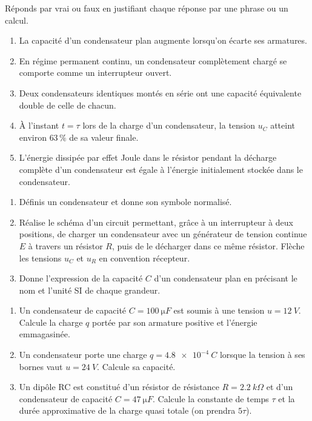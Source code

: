 \documentclass[11pt]{article}
\begin{document}
\begin{exercice}
Réponds par vrai ou faux en justifiant chaque réponse par une phrase ou un calcul.
\begin{enumerate}
\item La capacité d'un condensateur plan augmente lorsqu'on écarte ses armatures.
\item En régime permanent continu, un condensateur complètement chargé se comporte comme un interrupteur ouvert.
\item Deux condensateurs identiques montés en série ont une capacité équivalente double de celle de chacun.
\item À l'instant $t = \tau$ lors de la charge d'un condensateur, la tension $u_C$ atteint environ $63\,\%$ de sa valeur finale.
\item L'énergie dissipée par effet Joule dans le résistor pendant la décharge complète d'un condensateur est égale à l'énergie initialement stockée dans le condensateur.
\end{enumerate}
\end{exercice}

\begin{exercice}
\begin{enumerate}
\item Définis un condensateur et donne son symbole normalisé.
\item Réalise le schéma d'un circuit permettant, grâce à un interrupteur à deux positions, de charger un condensateur avec un générateur de tension continue $E$ à travers un résistor $R$, puis de le décharger dans ce même résistor. Flèche les tensions $u_C$ et $u_R$ en convention récepteur.
\item Donne l'expression de la capacité $C$ d'un condensateur plan en précisant le nom et l'unité SI de chaque grandeur.
\end{enumerate}
\end{exercice}

\begin{exercice}
\begin{enumerate}
\item Un condensateur de capacité $C = \SI{100}{\micro F}$ est soumis à une tension $u = \SI{12}{V}$. Calcule la charge $q$ portée par son armature positive et l'énergie emmagasinée.
\item Un condensateur porte une charge $q = \SI{4,8e-4}{C}$ lorsque la tension à ses bornes vaut $u = \SI{24}{V}$. Calcule sa capacité.
\item Un dipôle RC est constitué d'un résistor de résistance $R = \SI{2,2}{k\Omega}$ et d'un condensateur de capacité $C = \SI{47}{\micro F}$. Calcule la constante de temps $\tau$ et la durée approximative de la charge quasi totale (on prendra $5\tau$).
\end{enumerate}
\end{exercice}
\end{document}
